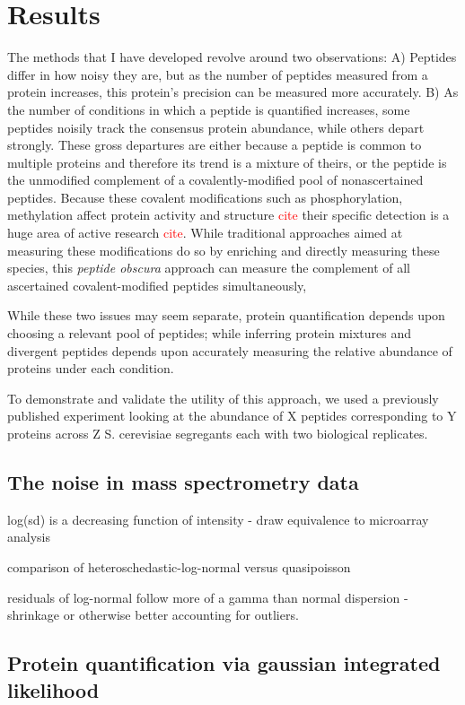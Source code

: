 \documentclass[12pt]{article}
\begin{document}
\section*{Results}

The methods that I have developed revolve around two observations: A) Peptides differ in how noisy they are, but as the number of peptides measured from a protein increases, this protein's precision can be measured more accurately. B) As the number of conditions in which a peptide is quantified increases, some peptides noisily track the consensus protein abundance, while others depart strongly. These gross departures are either because a peptide is common to multiple proteins and therefore its trend is a mixture of theirs, or the peptide is the unmodified complement of a covalently-modified pool of nonascertained peptides. Because these covalent modifications such as phosphorylation, methylation affect protein activity and structure \textcolor{red}{cite} their specific detection is a huge area of active research \textcolor{red}{cite}.  While traditional approaches aimed at measuring these modifications do so by enriching and directly measuring these species, this \textit{peptide obscura} approach can measure the complement of all ascertained covalent-modified peptides simultaneously,

While these two issues may seem separate, protein quantification depends upon choosing a relevant pool of peptides; while inferring protein mixtures and divergent peptides depends upon accurately measuring the relative abundance of proteins under each condition.

To demonstrate and validate the utility of this approach, we used a previously published experiment looking at the abundance of X peptides corresponding to Y proteins across Z S. cerevisiae segregants each with two biological replicates.

\subsection*{The noise in mass spectrometry data}

log(sd) is a decreasing function of intensity - draw equivalence to microarray analysis

comparison of heteroschedastic-log-normal versus quasipoisson

residuals of log-normal follow more of a gamma than normal dispersion - shrinkage or otherwise better
accounting for outliers.

\subsection*{Protein quantification via gaussian integrated likelihood}
\end{document}
